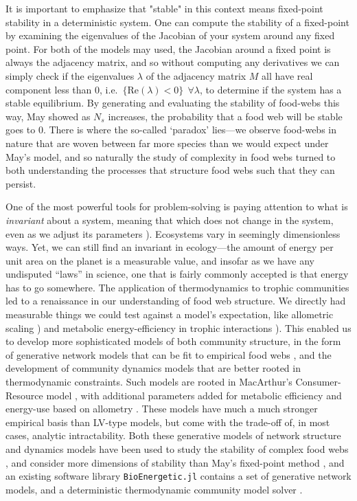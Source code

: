 \documentclass[]{article}
\begin{document}
It is important to emphasize that "stable" in this context means
fixed-point stability in a deterministic system. One can compute the
stability of a fixed-point by examining the eigenvalues of the Jacobian
of your system around any fixed point. For both of the models may used,
the Jacobian around a fixed point is always the adjacency matrix, and so
without computing any derivatives we can simply check if the eigenvalues
\(\lambda\) of the adjacency matrix \(M\) all have real component less
than \(0\), i.e.~\(\{ \text{Re}(\lambda) < 0 \} \ \ \forall\lambda\), to
determine if the system has a stable equilibrium. By generating and
evaluating the stability of food-webs this way, May showed as \(N_s\)
increases, the probability that a food web will be stable goes to \(0\).
There is where the so-called `paradox' lies---we observe food-webs in
nature that are woven between far more species than we would expect
under May's model, and so naturally the study of complexity in food webs
turned to both understanding the processes that structure food webs such
that they can persist.

One of the most powerful tools for problem-solving is paying attention
to what is \emph{invariant} about a system, meaning that which does not
change in the system, even as we adjust its parameters
\citep{@polya_how_2009}). Ecosystems vary in seemingly dimensionless ways.
Yet, we can still find an invariant in ecology---the amount of energy
per unit area on the planet is a measurable value, and insofar as we
have any undisputed ``laws'' in science, one that is fairly commonly
accepted is that energy has to go somewhere. The application of
thermodynamics to trophic communities led to a renaissance in our
understanding of food web structure. We directly had measurable things
we could test against a model's expectation, like allometric scaling
\citep{cohen_food_1977, gravel_trophic_2011, stouffer_robust_2006}) and metabolic energy-efficiency in
trophic interactions \citep{yodzis_body_1992}). This enabled us to
develop more sophisticated models of both community structure, in the
form of generative network models \citep{cohen_food_1977,williams_simple_2000} that can be fit to empirical food webs \citep{allesina_general_2008}, and the development of community
dynamics models that are better rooted in thermodynamic constraints. Such models are rooted in MacArthur's Consumer-Resource model \cite{macarthur_cr}, with additional parameters added for metabolic efficiency and energy-use based on allometry \citep{yodzis_body_1992}. These models have much a much stronger empirical basis than LV-type models, but come with the trade-off of, in most cases, analytic intractability. Both these generative models of network structure and dynamics models have been used to study the stability of complex food webs \cite{allesina_stability_2012,allesina_predicting_2015}, and consider more dimensions of stability than May's fixed-point method \cite{dominguezpaper}, and an existing software library \texttt{BioEnergetic.jl} contains a set of generative network models, and a deterministic thermodynamic community model solver \citep{delmas_simulation_2017}.
\end{document}
